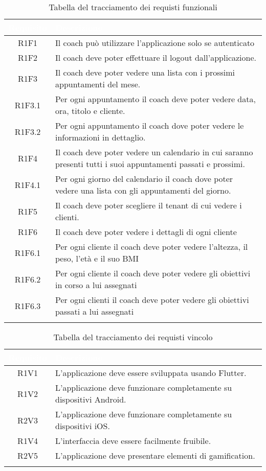 \setlength\arrayrulewidth{1pt}
\renewcommand{\arraystretch}{1.5}
\begin{longtable}{| c | C{10cm}|}
\label{tab:requisiti-funzionali-coach}

\textcolor{white}{\textbf{Requisito}} & \textcolor{white}{\textbf{Descrizione}}\\\hline
\endhead
R1F1 & Il coach può utilizzare l'applicazione solo se autenticato\\\hline
R1F2 & Il coach deve poter effettuare il logout dall'applicazione.\\\hline
R1F3 & Il coach deve poter vedere una lista con i prossimi appuntamenti del mese. \\\hline
R1F3.1 & Per ogni appuntamento il coach deve poter vedere data, ora, titolo e cliente. \\\hline
R1F3.2 & Per ogni appuntamento il coach dove poter vedere le informazioni in dettaglio. \\\hline
R1F4 & Il coach deve poter vedere un calendario in cui saranno presenti tutti i suoi appuntamenti passati e prossimi.\\\hline
R1F4.1 & Per ogni giorno del calendario il coach dove poter vedere una lista con gli appuntamenti del giorno.\\\hline
R1F5 & Il coach deve poter scegliere il tenant di cui vedere i clienti.\\\hline
R1F6 &Il coach deve poter vedere i dettagli di ogni cliente\\\hline
R1F6.1 & Per ogni cliente il coach deve poter vedere l’altezza, il peso, l’età e il suo \gls{BMI}\\\hline
R1F6.2 & Per ogni cliente il coach deve poter vedere gli obiettivi in corso a lui assegnati\\\hline
R1F6.3 & Per ogni clienti il coach deve poter vedere gli obiettivi passati a lui assegnati\\\hline


\caption{Tabella del tracciamento dei requisti funzionali}
\end{longtable}

\setlength\arrayrulewidth{1pt}
\renewcommand{\arraystretch}{1.5}
\begin{longtable}{| c | C{10cm}|}
\label{tab:requisiti-vincolo-coach}
\textcolor{white}{\textbf{Requisito}} & \textcolor{white}{\textbf{Descrizione}}\\ \hline
\endhead
R1V1 & L'applicazione deve essere sviluppata usando Flutter. \\\hline
R1V2 & L'applicazione deve funzionare completamente su dispositivi Android. \\\hline
R2V3 & L'applicazione deve funzionare completamente su dispositivi iOS. \\\hline
R1V4 & L'interfaccia deve essere facilmente fruibile. \\\hline
R2V5 & L'applicazione deve presentare elementi di \gls{gamification}.\\\hline
\caption{Tabella del tracciamento dei requisti vincolo}
\end{longtable}


